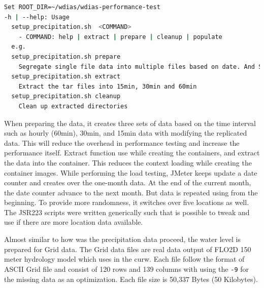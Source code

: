 \begin{lstlisting}[language=sh, caption=Preparation of precipitation data.]
Set ROOT_DIR=~/wdias/wdias-performance-test
-h | --help: Usage
  setup_precipitation.sh  <COMMAND>
    - COMMAND: help | extract | prepare | cleanup | populate
  e.g.
  setup_precipitation.sh prepare
    Segregate single file data into multiple files based on date. And Separate into main directories of 15min, 30min, 60min and create tar files
  setup_precipitation.sh extract
    Extract the tar files into 15min, 30min and 60min
  setup_precipitation.sh cleanup
    Clean up extracted directories
\end{lstlisting}
When preparing the data, it creates three sets of data based on the time interval such as hourly (60min), 30min, and 15min data with modifying the replicated data.
This will reduce the overhead in performance testing and increase the performance itself.
Extract function use while creating the containers, and extract the data into the container. This reduces the context loading while creating the container images.
While performing the load testing,  JMeter keeps update a date counter and creates over the one-month data. At the end of the current month, the date counter advance to the next month. But data is repeated using from the beginning. To provide more randomness, it switches over five locations as well. The JSR223 scripts were written generically such that is possible to tweak and use if there are more location data available.

Almost similar to how was the precipitation data proceed, the water level is prepared for Grid data. The Grid data files are real data output of FLO2D 150 meter hydrology model which uses in the \acrshort{curw}. Each file follow the format of ASCII Grid file and consist of 120 rows and 139 columns with using the \texttt{-9} for the missing data as an optimization. Each file size is 50,337 Bytes (50 Kilobytes).

